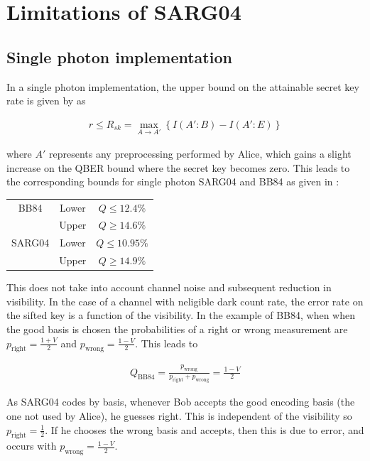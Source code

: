 \documentclass[paper=a4, fontsize=11pt]{scrartcl} %
\numberwithin{equation}{section} %
\numberwithin{figure}{section} %
\numberwithin{table}{section} %
\begin{document}
\clearpage
\section{Limitations of SARG04}
\subsection{Single photon implementation}
In a single photon implementation, the upper bound on the attainable secret key rate is given by \citet{csiszarAssump} as

\begin{align}
r \leq R_{sk} = \max_{A \rightarrow A'}
\left\{
I(A':B) - I(A': E)
\right\}
\end{align}

where $A'$ represents any preprocessing performed by Alice, which gains a slight increase on the QBER bound where the secret key
becomes zero. This leads to the corresponding bounds for single photon SARG04 and BB84 as given in \citet{bounds, branciardSARG04}:

\bgroup
\def\arraystretch{1.2}%
\begin{center}
\begin{tabular}{c c c}
\hline
BB84 						& Lower & $Q \leq 12.4\%$ \\
\hphantom{BB84}	& Upper & $Q \geq 14.6\%$\\
\hline
SARG04  				& Lower & $Q \leq 10.95\%$ \\
\hphantom{BB84}	& Upper & $Q \geq 14.9\%$\\
\hline
\end{tabular}
\end{center}
\egroup

This does not take into account channel noise and subsequent reduction in visibility. In the case of a channel with
neligible dark count rate, the error rate on the sifted key is a function of the visibility. In the example of BB84, when
when the good basis is chosen the probabilities of a right or wrong measurement are $p_{\mathrm{right}} = \frac{1+V}{2}$ and
$p_{\mathrm{wrong}} = \frac{1-V}{2}$. This leads to

\begin{align}
	Q_{\mathrm{BB84}} =
	\frac{p_{\mathrm{wrong}}}{p_{\mathrm{right}} + p_{\mathrm{wrong}}}
	= \frac{1-V}{2}
\end{align}

As SARG04 codes by basis, whenever Bob accepts the good encoding basis (the one not used by Alice), he guesses right.
This is independent of the visibility so $p_{\mathrm{right}} = \frac{1}{2}$. If he chooses the wrong basis and accepts,
then this is due to error, and occurs with $p_{\mathrm{wrong}} = \frac{1-V}{2}$.
\end{document}
